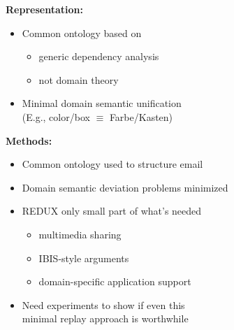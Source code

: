 \begin{LARGE}
\begin{center}
{\bf Representation:}
\end{center}

\begin{itemize}
\item Common ontology based on
  \begin{itemize}
  \item generic dependency analysis
  \item not domain theory
  \end{itemize}
\item Minimal domain semantic unification\\
(E.g., color/box $\equiv$ Farbe/Kasten)
\end{itemize}


\newpage
\begin{center}
{\bf Methods:}
\end{center}

\begin{itemize}
\item Common ontology used to structure email
\item Domain semantic deviation problems minimized
\item REDUX only small part of what's needed
  \begin{itemize}
  \item multimedia sharing
  \item IBIS-style arguments
  \item domain-specific application support
  \end{itemize}
\item Need experiments to show if even this \\minimal replay approach is
worthwhile 
\end{itemize}

\end{LARGE}

